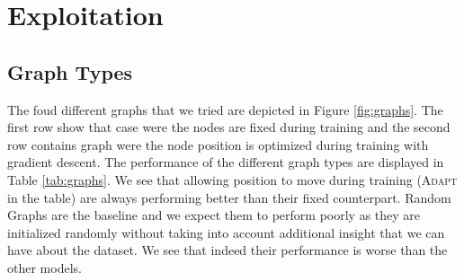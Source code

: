 \documentclass[a4paper,10pt]{article}
\begin{document}
\section{Exploitation}

\subsection{Graph Types}

The foud different graphs that we tried are depicted in Figure \ref{fig:graphs}. The first row show that case were the nodes are fixed during training and the second row contains graph were the node position is optimized during training with gradient descent.
The performance of the different graph types are displayed in Table \ref{tab:graphs}.
We see that allowing position to move during training (\textsc{Adapt} in the table) are always performing better than their fixed counterpart. Random Graphs are the baseline and we expect them to perform poorly as they are initialized randomly without taking into account additional insight that we can have about the dataset. We see that indeed their performance is worse than the other models.
\end{document}
